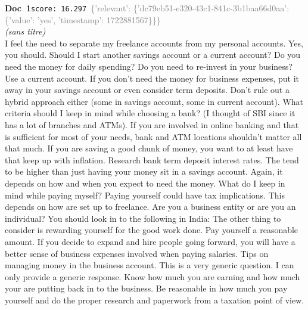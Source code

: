 \documentclass[a4paper,11pt]{article}
\begin{document}
\begin{docenv}
{\footnotesize\textcolor{doccolor}{\textbf{Doc~1}}}\hfill{\tiny\texttt{score:~16.297}}\ {\tiny\textcolor{gray}{\{'relevant': \{'dc79eb51-e320-43c1-841c-3b1baa66d0aa': \{'value': 'yes', 'timestamp': 1722881567\}\}\}}}\\[3pt]
{\small\textit{(sans titre)}}\\[2pt]
\vspace{2pt}
{\footnotesize 
I feel the need to separate my freelance accounts from my personal accounts. Yes, you should. Should I start another savings account or a current account? Do you need the money for daily spending? Do you need to re-invest in your business? Use a current account. If you don't need the money for business expenses, put it away in your savings account or even consider term deposits. Don't rule out a hybrid approach either (some in savings account, some in current account). What criteria should I keep in mind while choosing a bank? (I thought of SBI since it has a lot of branches and ATMs). If you are involved in online banking and that is sufficient for most of your needs, bank and ATM locations shouldn't matter all that much. If you are saving a good chunk of money, you want to at least have that keep up with inflation. Research bank term deposit interest rates. The tend to be higher than just having your money sit in a savings account. Again, it depends on how and when you expect to need the money. What do I keep in mind while paying myself? Paying yourself could have tax implications. This depends on how are set up to freelance. Are you a business entity or are you an individual? You should look in to the following in India: The other thing to consider is rewarding yourself for the good work done. Pay yourself a reasonable amount. If you decide to expand and hire people going forward, you will have a better sense of business expenses involved when paying salaries. Tips on managing money in the business account. This is a very generic question. I can only provide a generic response. Know how much you are earning and how much your are putting back in to the business. Be reasonable in how much you pay yourself and do the proper research and paperwork from a taxation point of view.}
\end{docenv}
\end{document}
